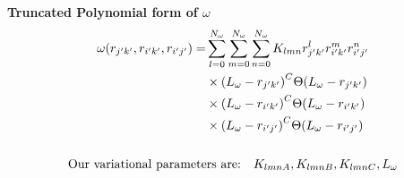 \documentclass[10pt]{beamer}
\begin{document}
\begin{frame}[allowframebreaks]
    \textbf{Truncated Polynomial form of $\omega$}
    \begin{gather}
        \begin{align}
            \omega\pqty{r_{j'k'},r_{i'k'},r_{i'j'}}=&
            \sum\limits_{l=0}^{N_\omega}
            \sum\limits_{m=0}^{N_\omega}
            \sum\limits_{n=0}^{N_\omega}
            K_{lmn}r_{j'k'}^{l}r_{i'k'}^{m}r_{i'j'}^n\nonumber\\
            &\times\pqty{L_\omega-r_{j'k'}}^C
            \Theta\pqty{L_\omega-r_{j'k'}}\nonumber\\
            &\times\pqty{L_\omega-r_{i'k'}}^C
            \Theta\pqty{L_\omega-r_{i'k'}}\nonumber\\
            &\times\pqty{L_\omega-r_{i'j'}}^C
            \Theta\pqty{L_\omega-r_{i'j'}}
        \end{align}\\
        \\
        \nonumber%
        \text{Our variational parameters are:}\quad
        K_{lmnA},K_{lmnB},K_{lmnC},L_\omega%
    \end{gather}
\end{frame}
\end{document}
